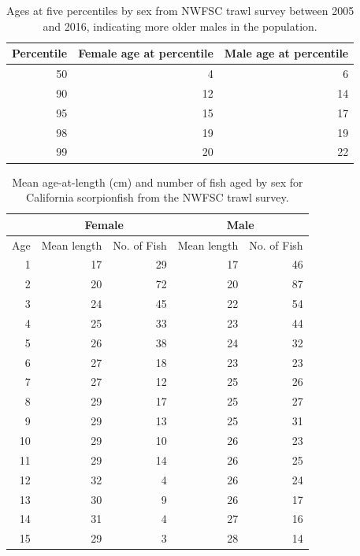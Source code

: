 \documentclass[12pt,]{article}
\begin{document}
\begin{table}[ht]
\centering
\caption{Ages at five percentiles by sex from 
                                          NWFSC trawl survey between 2005 and 2016, 
                                          indicating more older males in the population.} 
\label{tab:Fleet8_NWFSCTrawl_agepercents}
\begin{tabular}{rrr}
  \hline
Percentile & Female age at percentile & Male age at percentile \\ 
  \hline
50 & 4 & 6 \\ 
  90 & 12 & 14 \\ 
  95 & 15 & 17 \\ 
  98 & 19 & 19 \\ 
  99 & 20 & 22 \\ 
   \hline
\end{tabular}
\end{table}\begin{table}[ht]
\centering
\caption{Mean age-at-length (cm) and number of 
                                                    fish aged by sex for 
                                                    California scorpionfish from the NWFSC
                                                      trawl survey.} 
\label{tab:Fleet8_NWFSCTrawl_meanAatL}
\begin{tabular}{rrrrr}
  &  \multicolumn{2}{c}{Female} 
                                   &  \multicolumn{2}{c}{Male} \\
 \hline
Age & Mean  length & No. of Fish & Mean length & No. of Fish \\ 
  \hline
1 & 17 & 29 & 17 & 46 \\ 
  2 & 20 & 72 & 20 & 87 \\ 
  3 & 24 & 45 & 22 & 54 \\ 
  4 & 25 & 33 & 23 & 44 \\ 
  5 & 26 & 38 & 24 & 32 \\ 
  6 & 27 & 18 & 23 & 23 \\ 
  7 & 27 & 12 & 25 & 26 \\ 
  8 & 29 & 17 & 25 & 27 \\ 
  9 & 29 & 13 & 25 & 31 \\ 
  10 & 29 & 10 & 26 & 23 \\ 
  11 & 29 & 14 & 26 & 25 \\ 
  12 & 32 & 4 & 26 & 24 \\ 
  13 & 30 & 9 & 26 & 17 \\ 
  14 & 31 & 4 & 27 & 16 \\ 
  15 & 29 & 3 & 28 & 14 \\ 

\end{tabular}
\end{table}
\end{document}
